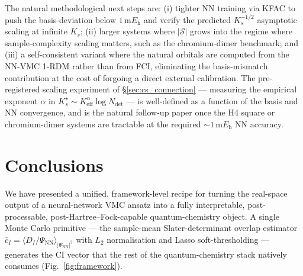 \documentclass[journal=jctcce,manuscript=article,layout=traditional]{achemso}
\begin{document}
The natural methodological next steps are: (i) tighter NN training via
KFAC to push the basis-deviation below $1\,\mathrm{m}E_{\mathrm{h}}$
and verify the predicted $K_s^{-1/2}$ asymptotic scaling at infinite
$K_s$; (ii) larger systems where $|\mathcal{S}|$ grows into the regime
where sample-complexity scaling matters, such as the chromium-dimer
benchmark; and (iii) a self-consistent variant where the natural
orbitals are computed from the NN-VMC 1-RDM rather than from FCI,
eliminating the basis-mismatch contribution at the cost of forgoing a
direct external calibration. The pre-registered scaling experiment of
\S\ref{sec:cs_connection} --- measuring the empirical exponent
$\alpha$ in $K_s^{\star} \sim K_{\text{eff}}^{\alpha} \log
N_{\mathrm{det}}$ --- is well-defined as a function of the basis and
NN convergence, and is the natural follow-up paper once the H4
square or chromium-dimer systems are tractable at the required
$\sim 1\,\mathrm{m}E_{\mathrm{h}}$ NN accuracy.

\section{Conclusions}

We have presented a unified, framework-level recipe for turning the
real-space output of a neural-network VMC ansatz into a fully
interpretable, post-processable, post-Hartree--Fock-capable
quantum-chemistry object. A single Monte Carlo primitive --- the
sample-mean Slater-determinant overlap estimator
$\widehat{c}_I = \langle D_I / \Psi_{\mathrm{NN}}
\rangle_{|\Psi_{\mathrm{NN}}|^2}$ with $L_2$ normalisation and Lasso
soft-thresholding --- generates the CI vector that the rest of the
quantum-chemistry stack natively consumes
(Fig.~\ref{fig:framework}).
\end{document}
